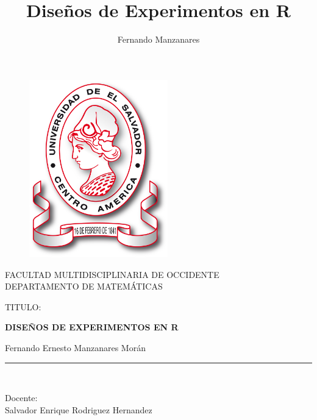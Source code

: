 \documentclass[12pt,letterpaper]{report}
\author{Fernando Manzanares}
\title{Diseños de Experimentos en R}
\begin{document}

\begin{titlepage}

\begin{center}
\vspace*{-1in}
\begin{figure}[htb]
\begin{center}
\includegraphics[width=6cm]{Minerva}
\end{center}
\end{figure}

FACULTAD MULTIDISCIPLINARIA DE OCCIDENTE\\
\vspace*{0.15in}
DEPARTAMENTO DE MATEMÁTICAS \\
\vspace*{0.6in}
\begin{large}
TITULO:\\
\end{large}
\vspace*{0.2in}
\begin{Large}
\textbf{DISEÑOS DE EXPERIMENTOS EN R} \\
\end{Large}
\vspace*{0.3in}
\begin{large}
Fernando Ernesto Manzanares Morán\\
\end{large}
\vspace*{0.3in}
\rule{80mm}{0.1mm}\\
\vspace*{0.1in}
\begin{large}
Docente: \\
Salvador Enrique Rodriguez Hernandez \\
\end{large}
\end{center}

\end{titlepage}
\end{document}
